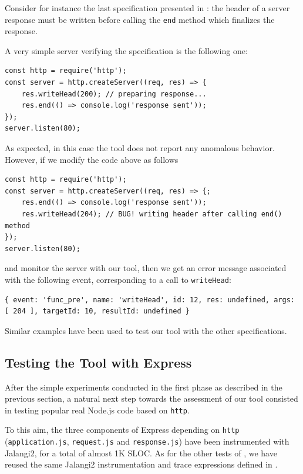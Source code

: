 Consider for instance the last specification presented in : 
the header of a server response must be written before calling the \lstinline{end} method which finalizes the response.

A very simple server verifying the specification is the following one:
\begin{lstlisting}
const http = require('http');
const server = http.createServer((req, res) => {
	res.writeHead(200); // preparing response...
	res.end(() => console.log('response sent'));
});
server.listen(80);
\end{lstlisting}

As expected, in this case the tool does not report any anomalous behavior.
However, if we modify the code above as follows
\begin{lstlisting}
const http = require('http');
const server = http.createServer((req, res) => {;
	res.end(() => console.log('response sent'));
	res.writeHead(204); // BUG! writing header after calling end() method
});
server.listen(80);
\end{lstlisting}
and monitor the server with our tool, then we get an error message associated with the following event, corresponding
to a call to \lstinline{writeHead}:
\begin{lstlisting}
{ event: 'func_pre', name: 'writeHead', id: 12, res: undefined, args: [ 204 ], targetId: 10, resultId: undefined }
\end{lstlisting}

Similar examples have been used to test our tool with the other specifications.

\subsection{Testing the Tool with Express}\label{sec:express}

After the simple experiments conducted in the first phase as described in the previous section,
a natural next step towards the assessment of our tool consisted in testing popular real Node.js code
based on \lstinline{http}.

To this aim, the three components of Express depending on \lstinline{http} (\lstinline{application.js}, \lstinline{request.js} and
\lstinline{response.js}) have been instrumented with Jalangi2, for a total of almost 1K SLOC.
As for the other tests of , we have reused the same Jalangi2 instrumentation and trace expressions defined in .

